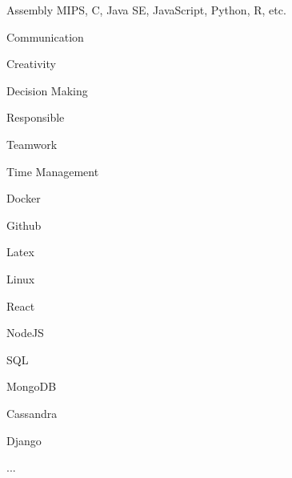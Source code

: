\begin{cventries}
    \cventry
        {}
   		{}
   		{}
   		{}
        {
            \begin{cvitems}
 	           Assembly MIPS,  C, Java SE, JavaScript, Python, R, etc.
            \end{cvitems}
        }
\end{cventries}
\begin{cventries}
    \cventry
        {}
        {}
        {}
        {}
        {
            \begin{cvitems}
                \item Communication
                \item Creativity
                \item Decision Making
                \item Responsible
                \item Teamwork
                \item Time Management
            \end{cvitems}
        }
\end{cventries}
\begin{cventries}
    \cventry
        {}
        {}
        {}
        {}
        {
            \begin{cvitems}
                \item Docker
                \item Github
                \item Latex
                \item Linux
                \item React
                \item NodeJS
                \item SQL
                \item MongoDB
                \item Cassandra
                \item Django
                \item ...
            \end{cvitems}
        }
\end{cventries}
